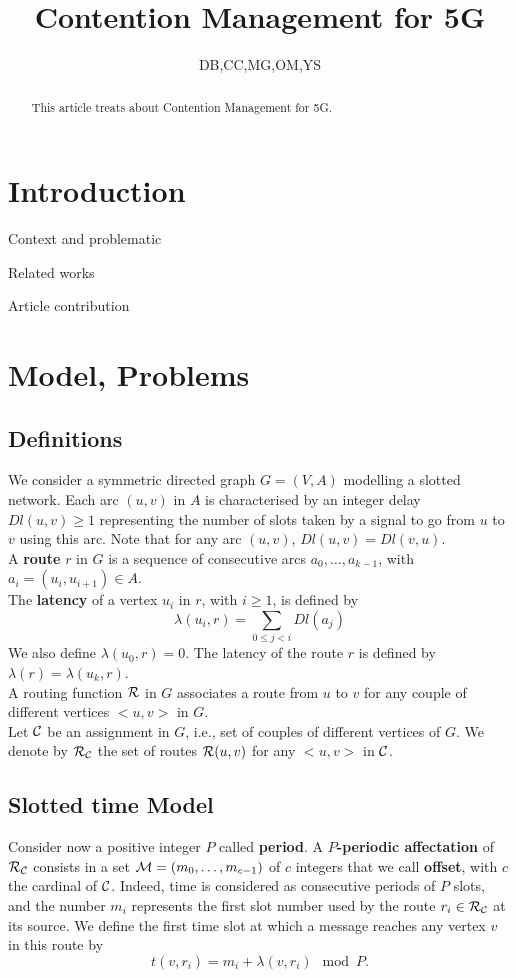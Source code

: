 \documentclass[a4paper,10pt]{article}
\title{Contention Management for 5G}
\author{DB,CC,MG,OM,YS}
\begin{document}
\maketitle

\begin{abstract}
This article treats about Contention Management for 5G.
\end{abstract}

\section{Introduction}
  \itemize
    \item Context and problematic
    \item Related works
    \item Article contribution

\section{Model, Problems}

  \subsection{Definitions}
  
	We consider a symmetric directed graph $G=(V,A)$ modelling a slotted network. Each arc  $(u,v)$ in $A$ is characterised by an integer delay $Dl(u,v) \geq 1$ representing the number of slots taken by a signal to go from $u$ to $v$ using this arc. Note that for any arc $(u,v)$, $Dl(u,v)=Dl(v,u)$.\\
      A {\bf route} $r$ in $G$ is a sequence of consecutive arcs $a_0, \ldots , a_{k-1}$, with $a_i=(u_i,u_{i+1}) \in A$. \\ 
      The {\bf latency} of a vertex $u_i$ in $r$, with $i \geq 1$, is defined by $$\lambda(u_i,r)= \sum\limits_{0 \leq j <i} Dl(a_j)$$ We also define $\lambda(u_0,r)=0$.
      The latency of the route $r$ is defined by $\lambda (r)= \lambda (u_k,r)$.\\
      A routing function $\cal R$ in $G$ associates a route from $u$ to $v$ for any couple of different vertices $<u,v>$ in $G$.\\
      Let $\cal C$ be an {assignment} in $G$, i.e., set of couples of different vertices of $G$. We denote by $\cal R_{\cal C}$ the set of routes ${\cal R}(u,v)$ for any $<u,v>$ in $\cal C$. 

   \subsection{Slotted time Model}
      Consider now a positive integer $P$ called {\bf period}. A {\bf $P$-periodic affectation} of $\cal R_{\cal C}$ consists in a set  ${\cal M}=(m_0, \ldots ,m_{c-1})$
      of $c$ integers that we call {\bf offset}, with $c$ the cardinal of $\cal C$. Indeed, time is considered as consecutive periods of $P$ slots, and the number $m_i$ represents the first slot number used by the route $r_i \in {\cal R}_{\cal C}$ at its source.
      We define the first time slot at which a message reaches any vertex $v$ in this route by $$t(v,r_i) = m_i+\lambda(v,r_i) \mod P.$$
\end{document}
